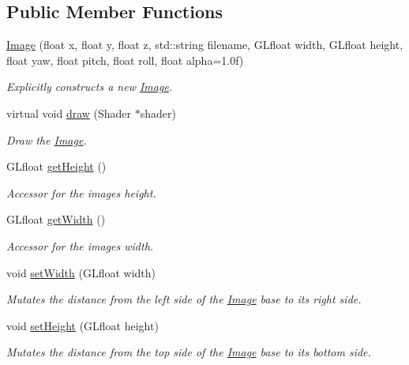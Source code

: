 \subsection*{Public Member Functions}
\begin{DoxyCompactItemize}
\item 
\hyperlink{classtsgl_1_1_image_a98fa157fbdb5771729da59bc08b50a1b}{Image} (float x, float y, float z, std\+::string filename, G\+Lfloat width, G\+Lfloat height, float yaw, float pitch, float roll, float alpha=1.\+0f)
\begin{DoxyCompactList}\small\item\em Explicitly constructs a new \hyperlink{classtsgl_1_1_image}{Image}. \end{DoxyCompactList}\item 
virtual void \hyperlink{classtsgl_1_1_image_a42c7d354c766d06779d46e2ad0667027}{draw} (Shader $\ast$shader)
\begin{DoxyCompactList}\small\item\em Draw the \hyperlink{classtsgl_1_1_image}{Image}. \end{DoxyCompactList}\item 
G\+Lfloat \hyperlink{classtsgl_1_1_image_acea652163c4392c88b6f0442e5dd051a}{get\+Height} ()
\begin{DoxyCompactList}\small\item\em Accessor for the image\textquotesingle{}s height. \end{DoxyCompactList}\item 
G\+Lfloat \hyperlink{classtsgl_1_1_image_ace08e96c94a3798d6fdb6cb60259e3fc}{get\+Width} ()
\begin{DoxyCompactList}\small\item\em Accessor for the image\textquotesingle{}s width. \end{DoxyCompactList}\item 
void \hyperlink{classtsgl_1_1_image_a4242ccf591c44bc4619dd2a867a801ff}{set\+Width} (G\+Lfloat width)
\begin{DoxyCompactList}\small\item\em Mutates the distance from the left side of the \hyperlink{classtsgl_1_1_image}{Image} base to its right side. \end{DoxyCompactList}\item 
void \hyperlink{classtsgl_1_1_image_adc7bfcf30f2bd707177488d471ed2d77}{set\+Height} (G\+Lfloat height)
\begin{DoxyCompactList}\small\item\em Mutates the distance from the top side of the \hyperlink{classtsgl_1_1_image}{Image} base to its bottom side. \end{DoxyCompactList}\item 

\end{DoxyCompactItemize}
